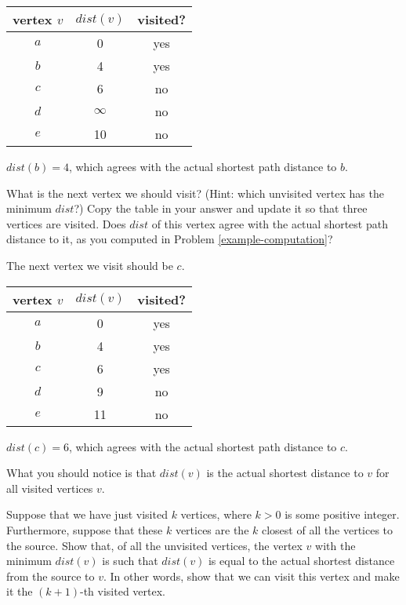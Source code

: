 \documentclass[11pt]{article}
\begin{document}
\begin{center}
\begin{tabular}{ c | c | c }
vertex $v$ & $dist(v)$ & visited? \\
\hline
$a$ & 0 & yes \\
$b$ & 4 & yes \\
$c$ & 6 & no \\
$d$ & $\infty$ & no \\
$e$ & 10 & no
\end{tabular}
\end{center}

$dist(b) = 4$, which agrees with the actual shortest path distance to $b$.

\begin{problem} %
What is the next vertex we should visit? (Hint: which unvisited vertex has the minimum $dist$?)
Copy the table in your answer and update it so that three vertices are visited. Does $dist$ of this vertex agree with the actual
shortest path distance to it, as you computed in Problem \ref{example-computation}?
\end{problem}

\begin{solution}
The next vertex we visit should be $c$.
\begin{center}
\begin{tabular}{ c | c | c }
vertex $v$ & $dist(v)$ & visited? \\
\hline
$a$ & 0 & yes \\
$b$ & 4 & yes \\
$c$ & 6 & yes \\
$d$ & 9 & no \\
$e$ & 11 & no
\end{tabular}
\end{center}
$dist(c) = 6$, which agrees with the actual shortest path distance to $c$.
\end{solution}

What you should notice is that $dist(v)$ is the actual shortest distance to $v$ for all visited vertices $v$.

\begin{problem} %
Suppose that we have just visited $k$ vertices, where $k > 0$ is some positive integer. Furthermore, suppose that these $k$ vertices
are the $k$ closest of all the vertices to the source. Show that, of all the unvisited vertices, the vertex $v$ with the minimum $dist(v)$
is such that $dist(v)$ is equal to the actual shortest distance from the source to $v$. In other words, show that we can visit this vertex
and make it the $(k+1)$-th visited vertex.
\end{problem}
\end{document}
